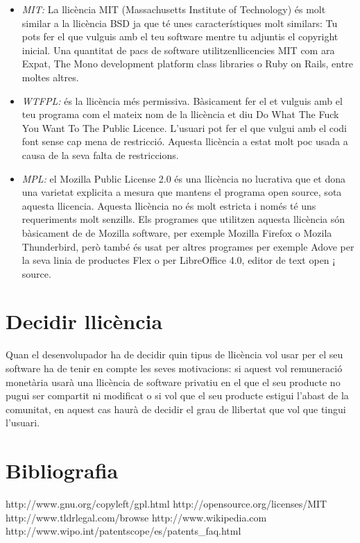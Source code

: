 \begin{itemize}
\item \emph{MIT:} La llicència MIT (Massachusetts Institute of Technology) és 
molt similar a la llicència BSD ja que té unes característiques molt similars: 
Tu pots fer el que vulguis amb el teu software mentre tu adjuntis el copyright 
inicial. Una quantitat de pacs de software utilitzenllicencies MIT com ara Expat, 
The Mono development platform class libraries o Ruby on Rails, entre moltes altres.
\item \emph{WTFPL:} és la llicència més permissiva. Bàsicament fer el et vulguis 
amb el teu programa com el mateix nom de la llicència et diu Do What The Fuck You 
Want To The Public Licence. L'usuari pot fer el que vulgui amb el codi font 
sense cap mena de restricció. Aquesta llicència a estat molt poc usada a causa de 
la seva falta de restriccions.
\item \emph{MPL:} el Mozilla Public License 2.0 és una llicència no lucrativa 
que et dona una varietat explicita a mesura que mantens el programa open source, 
sota aquesta llicencia. Aquesta llicència no és molt estricta i només té uns 
requeriments molt senzills. Els programes que utilitzen aquesta llicència són 
bàsicament de de Mozilla software, per exemple Mozilla  Firefox o Mozila 
Thunderbird, però també és usat per altres programes per exemple Adove per 
la seva linia de productes Flex o per LibreOffice 4.0, editor de text open ¡ source.
\end{itemize}
\section{Decidir llicència}
Quan el desenvolupador ha de decidir quin tipus de llicència vol usar per el seu 
software ha de tenir en compte les seves motivacions: si aquest vol remuneració 
monetària usarà una llicència de software privatiu en el que el seu producte no 
pugui ser compartit ni modificat o si vol que el seu producte estigui l'abast de 
la comunitat, en aquest cas haurà de decidir el grau de llibertat que vol que tingui 
l'usuari.
\section{Bibliografia}
http://www.gnu.org/copyleft/gpl.html
http://opensource.org/licenses/MIT
http://www.tldrlegal.com/browse
http://www.wikipedia.com
http://www.wipo.int/patentscope/es/patents\_faq.html
